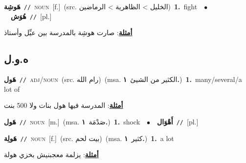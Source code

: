 \documentclass[10pt,a4paper,twoside]{article} %
\begin{document}
\begin{multicols}{2}
{\setlength\topsep{0pt}\textbf{\foreignlanguage{arabic}{هَوشِة}}\ {\color{gray}\texttt{//}\color{black}}\ \textsc{noun}\ [f.]\ (src. \color{gray}\foreignlanguage{arabic}{الخليل > الظاهرية > الرماضين}\color{black})\ \textbf{1.}~fight\ \ $\bullet$\ \ \setlength\topsep{0pt}\textbf{\foreignlanguage{arabic}{هُوَش}}\ {\color{gray}\texttt{//}\color{black}}\ [pl.]\  \begin{flushright}\color{gray}\foreignlanguage{arabic}{\textbf{\underline{\foreignlanguage{arabic}{أمثلة}}}: صارت هوشِة بالمدرسة بين عيِّل وأستاذ}\end{flushright}\color{black}} \vspace{2mm}

\vspace{-3mm}
\subsection*{\color{blue}\foreignlanguage{arabic}{ه.و.ل}\color{blue}{}} 

{\setlength\topsep{0pt}\textbf{\foreignlanguage{arabic}{هَول}}\ {\color{gray}\texttt{//}\color{black}}\ \textsc{adj/noun}\ (src. \color{gray}\foreignlanguage{arabic}{رام الله}\color{black})\ \color{gray}(msa. \foreignlanguage{arabic}{الكثير من الشيئ}~\foreignlanguage{arabic}{\textbf{١.}})\color{black}\ \textbf{1.}~many/several/a lot of\  \begin{flushright}\color{gray}\foreignlanguage{arabic}{\textbf{\underline{\foreignlanguage{arabic}{أمثلة}}}: المدرسة فيها هول بنات ولا 500 بنت}\end{flushright}\color{black}} \vspace{2mm}

{\setlength\topsep{0pt}\textbf{\foreignlanguage{arabic}{هَول}}\ {\color{gray}\texttt{//}\color{black}}\ \textsc{noun}\ [m.]\ \color{gray}(msa. \foreignlanguage{arabic}{صَدْمَة}~\foreignlanguage{arabic}{\textbf{١.}})\color{black}\ \textbf{1.}~shock\ \ $\bullet$\ \ \setlength\topsep{0pt}\textbf{\foreignlanguage{arabic}{أَهْوَال}}\ {\color{gray}\texttt{//}\color{black}}\ [pl.]\ } \vspace{2mm}

{\setlength\topsep{0pt}\textbf{\foreignlanguage{arabic}{هَولِة}}\ {\color{gray}\texttt{//}\color{black}}\ \textsc{noun}\ [f.]\ (src. \color{gray}\foreignlanguage{arabic}{بيت لحم}\color{black})\ \color{gray}(msa. \foreignlanguage{arabic}{كثير}~\foreignlanguage{arabic}{\textbf{١.}})\color{black}\ \textbf{1.}~a lot\  \begin{flushright}\color{gray}\foreignlanguage{arabic}{\textbf{\underline{\foreignlanguage{arabic}{أمثلة}}}: يزلمة معجبنيش بخزي هولة}\end{flushright}\color{black}} \vspace{2mm}


\end{multicols}
\end{document}
